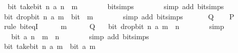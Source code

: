 \begin{isabellebody}
\ {\isacartoucheopen}{\isasymnot}\ bit\ {\isacharparenleft}{\kern0pt}take{\isacharunderscore}{\kern0pt}bit\ n\ a{\isacharparenright}{\kern0pt}\ {\isacharparenleft}{\kern0pt}n\ {\isacharplus}{\kern0pt}\ m{\isacharparenright}{\kern0pt}{\isacartoucheclose}\isanewline
\ \ \ \ \ \ \isamarkupfalse%
\ bit{\isacharunderscore}{\kern0pt}simps\isanewline
\ \ \ \ \ \ \isamarkupfalse%
\ {\isacharparenleft}{\kern0pt}simp\ add{\isacharcolon}{\kern0pt}\ bit{\isacharunderscore}{\kern0pt}simps{\isacharparenright}{\kern0pt}\ \isanewline
\ \ \ \ \isamarkupfalse%
\ \isamarkupfalse%
\ {\isacartoucheopen}bit\ {\isacharparenleft}{\kern0pt}drop{\isacharunderscore}{\kern0pt}bit\ n\ a{\isacharparenright}{\kern0pt}\ m\ {\isasymlongleftrightarrow}\ bit\ {}\ m{\isacartoucheclose}\isanewline
\ \ \ \ \ \ \isamarkupfalse%
\ {\isacharparenleft}{\kern0pt}simp\ add{\isacharcolon}{\kern0pt}\ bit{\isacharunderscore}{\kern0pt}simps{\isacharparenright}{\kern0pt}\isanewline
\ \ \isamarkupfalse%
\isanewline
{}\isamarkupfalse%
\isanewline
\ \ \isamarkupfalse%
\ {\isacharquery}{\kern0pt}Q\isanewline
\ \ \isamarkupfalse%
\ {\isacharquery}{\kern0pt}P\isanewline
\ \ \isamarkupfalse%
\ {\isacharparenleft}{\kern0pt}rule\ bit{\isacharunderscore}{\kern0pt}eqI{\isacharparenright}{\kern0pt}\isanewline
\ \ \ \ \isamarkupfalse%
\ m\isanewline
\ \ \ \ \isamarkupfalse%
\ {\isacartoucheopen}{\isacharquery}{\kern0pt}Q{\isacartoucheclose}\ \isamarkupfalse%
\ {\isacartoucheopen}{\isasymnot}\ bit\ {\isacharparenleft}{\kern0pt}drop{\isacharunderscore}{\kern0pt}bit\ n\ a{\isacharparenright}{\kern0pt}\ {\isacharparenleft}{\kern0pt}m\ {\isacharminus}{\kern0pt}\ n{\isacharparenright}{\kern0pt}{\isacartoucheclose}\isanewline
\ \ \ \ \ \ \isamarkupfalse%
\ simp\isanewline
\ \ \ \ \isamarkupfalse%
\ \isamarkupfalse%
\ {\isacartoucheopen}\ {\isasymnot}\ bit\ a\ {\isacharparenleft}{\kern0pt}n\ {\isacharplus}{\kern0pt}\ {\isacharparenleft}{\kern0pt}m\ {\isacharminus}{\kern0pt}\ n{\isacharparenright}{\kern0pt}{\isacharparenright}{\kern0pt}{\isacartoucheclose}\isanewline
\ \ \ \ \ \ \isamarkupfalse%
\ {\isacharparenleft}{\kern0pt}simp\ add{\isacharcolon}{\kern0pt}\ bit{\isacharunderscore}{\kern0pt}simps{\isacharparenright}{\kern0pt}\isanewline
\ \ \ \ \isamarkupfalse%
\ \isamarkupfalse%
\ {\isacartoucheopen}bit\ {\isacharparenleft}{\kern0pt}take{\isacharunderscore}{\kern0pt}bit\ n\ a{\isacharparenright}{\kern0pt}\ m\ {\isasymlongleftrightarrow}\ bit\ a\ m{\isacartoucheclose}\isanewline

\end{isabellebody}

